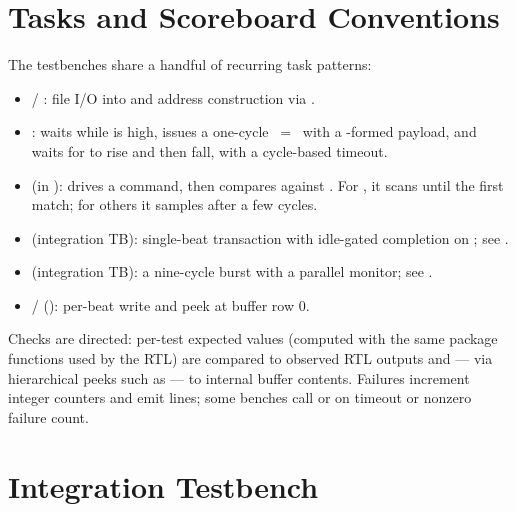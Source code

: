 \section{Tasks and Scoreboard Conventions}
\label{sec:verif-tasks}

The testbenches share a handful of recurring task patterns:

\begin{itemize}
    \item {} / : file I/O into
           and address construction via
          .
    \item {}: waits while  is high,
          issues a one-cycle ~=~ with
          a -formed payload, and waits for
           to rise and then fall, with a cycle-based
          timeout.
    \item {} (in ):
          drives a command, then compares 
          against . For
          , it scans until the first match; for others it
          samples after a few cycles.
    \item {} (integration TB): single-beat transaction with
          idle-gated completion on ; see
          .
    \item {} (integration TB): a nine-cycle
           burst with a parallel monitor; see
          .
    \item {} / 
          (): per-beat write and
          peek at buffer row 0.
\end{itemize}

Checks are directed: per-test expected values (computed with the same
package functions used by the RTL) are compared to observed RTL outputs
and --- via hierarchical peeks such as
 --- to internal buffer contents.
Failures increment integer counters and emit  lines; some
benches call  or  on timeout or nonzero failure
count.

\section{Integration Testbench}
\label{sec:verif-integration}

